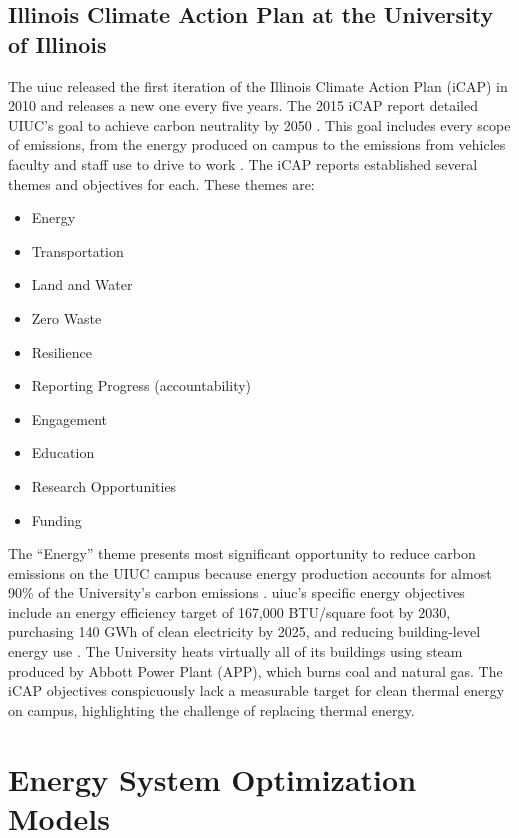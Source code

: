 \subsection{Illinois Climate Action Plan at the University of Illinois}

The \gls{uiuc} released the first iteration
of the Illinois Climate Action Plan (iCAP) in 2010 and releases a new one every five years.
The 2015 iCAP report detailed UIUC’s goal to achieve carbon neutrality by 2050
\cite{institute_for_sustainability_energy_and_environment_illinois_2015}.
This goal includes every scope of emissions, from the energy produced on campus to
the emissions from vehicles faculty and staff use to drive to work
\cite{institute_for_sustainability_energy_and_environment_illinois_2015,
institute_for_sustainability_energy_and_environment_illinois_2020}. The
iCAP reports established several themes and objectives for each. These themes are:
\begin{itemize}
  \item Energy
  \item Transportation
  \item Land and Water
  \item Zero Waste
  \item Resilience
  \item Reporting Progress (accountability)
  \item Engagement
  \item Education
  \item Research Opportunities
  \item Funding
\end{itemize}
The ``Energy'' theme presents most significant opportunity to reduce carbon emissions
on the UIUC campus because energy production accounts for almost 90\% of the University's
carbon emissions \cite{institute_for_sustainability_energy_and_environment_illinois_2015}.
\gls{uiuc}’s specific energy objectives include an energy
efficiency target of 167,000 BTU/square foot by 2030, purchasing 140 GWh of clean
electricity by 2025, and reducing building-level energy use
\cite{institute_for_sustainability_energy_and_environment_illinois_2020}.
The University heats virtually all of its buildings using steam produced by Abbott
Power Plant (APP), which burns coal and natural gas. The iCAP objectives conspicuously
lack a measurable target for clean thermal energy on campus, highlighting the
challenge of replacing thermal energy.

\section{Energy System Optimization Models}

